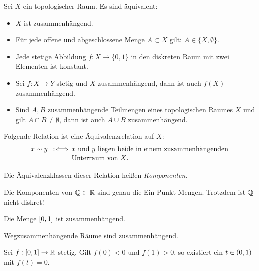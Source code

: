 \documentclass{cheat-sheet}
\begin{document}
\begin{prop}
  Sei $X$ ein topologischer Raum. Es sind äquivalent:
  \begin{itemize}
    \item $X$ ist zusammenhängend.
    \item Für jede offene und abgeschlossene Menge $A \subset X$ gilt: $A \in \{ X, \emptyset \}$.
    \item Jede stetige Abbildung $f : X \to \{ 0, 1 \}$ in den diskreten Raum mit zwei Elementen ist konstant.
  \end{itemize}
\end{prop}

\begin{prop}
  \begin{itemize}
    \item Sei $f : X \to Y$ stetig und $X$ zusammenhängend, dann ist auch $f(X)$ zusammenhängend.
    \item Sind $A, B$ zusammenhängende Teilmengen eines topologischen Raumes $X$ und gilt $A \cap B \not= \emptyset$, dann ist auch $A \cup B$ zusammenhängend.
  \end{itemize}
\end{prop}

\begin{kor}
  Folgende Relation ist eine Äquivalenzrelation auf $X$:
  \begin{align*}
    x \sim y \enspace:\!\iff \, &\text{$x$ und $y$ liegen beide in einem zusammenhängenden}\\[-2pt]
    &\text{Unterraum von $X$.}
  \end{align*}
\end{kor}

\begin{defn}
  Die Äquivalenzklassen dieser Relation heißen \emph{Komponenten}. %
\end{defn}

\begin{bsp}
  Die Komponenten von $\mathbb{Q} \subset \mathbb{R}$ sind genau die Ein-Punkt-Mengen. Trotzdem ist $\mathbb{Q}$ nicht diskret!
\end{bsp}

\begin{prop}
  Die Menge $\left[ 0, 1 \right]$ ist zusammenhängend.
\end{prop}

\begin{kor}
  Wegzusammenhängende Räume sind zusammenhängend.
\end{kor}

\begin{prop}[ZWS]
  Sei $f : \left[ 0, 1 \right] \to \mathbb{R}$ stetig. Gilt $f(0) < 0$ und $f(1) > 0$, so existiert ein $t \in \left( 0, 1 \right)$ mit $f(t) = 0$.
\end{prop}
\end{document}
